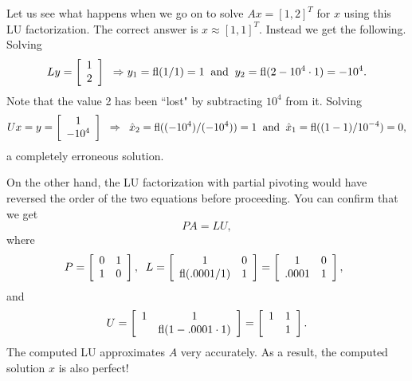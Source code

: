 \documentclass[11pt]{article}
\def\fl{\mbox{\rm fl}}
\newcommand{\twobytwo}[4]{
       \left[ \begin{array}{cc}
                #1 & #2  \\
                #3 & #4
               \end{array} \right] }
\newcommand{\twobyone}[2]{
       \left[ \begin{array}{cc}
                #1   \\
                #2
               \end{array} \right] }
\begin{document}
\begin{enumerate}
Let us see what happens when we go on to solve 
$Ax = [1, 2]^T$ for $x$ using this LU  factorization. The correct answer 
is $x \approx [1,1]^T$. Instead we get the following. Solving 
$${L}y = \twobyone{1}{2}
\;\; \Rightarrow y_1=\fl(1/1)=1 \;\; \mbox{and} \;\; 
y_2=\fl(2-10^4\cdot 1)=-10^4.$$ 
Note that the value 2 has been ``lost" by 
subtracting $10^4$ from it. Solving 
$${U}x = y = \twobyone{1}{-10^4} \;\; \Rightarrow \;\;
\hat x_2 = \fl((-10^4)/(-10^4)) = 1 \;\; \mbox{and} \;\;
\hat x_1 = \fl((1 - 1)/10^{-4}) = 0,$$ a completely erroneous solution.

On the other hand, the LU factorization with partial pivoting 
would have reversed the order of the two equations 
before proceeding. You can confirm that we get 
$$PA = LU,$$ 
where 
\[
P = \twobytwo{0}{1}{1}{0}, \;\; 
L =\left[\begin{array}{cc} 1 & 0 \\ \fl(.0001/1) & 1\end{array}\right]
         = \left[\begin{array}{cc} 1 & 0 \\ .0001 & 1\end{array}\right], \;\;
\]
and
\[
U =\left[\begin{array}{cc} 1 & 1\\  &\fl(1-.0001\cdot 1)
           \end{array}\right]
         = \left[\begin{array}{cc} 1 & 1\\  & 1 \end{array}\right]. 
\] 
The computed LU approximates $A$ very accurately. 
As a result, the computed solution $x$ is also perfect!

\end{enumerate}
\end{document}
